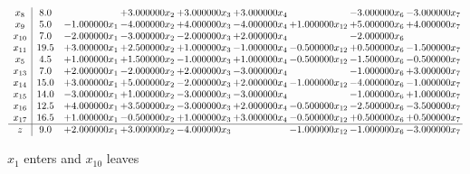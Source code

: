 \documentclass[10pt]{article}
\begin{document}
 \[\begin{array}{c| c c@{\hskip 2pt} c@{\hskip 2pt} c@{\hskip 2pt} c@{\hskip 2pt} c@{\hskip 2pt} c@{\hskip 2pt} c@{\hskip 2pt} }
 x_{8}   &  8.0  &   & + 3.000000 x_{2} & + 3.000000 x_{3} & + 3.000000 x_{4} &   & -3.000000 x_{6} & -3.000000 x_{7}\\
 x_{9}   &  5.0 & -1.000000 x_{1} & -4.000000 x_{2} & + 4.000000 x_{3} & -4.000000 x_{4} & + 1.000000 x_{12} & + 5.000000 x_{6} & + 4.000000 x_{7}\\
 x_{10}   &  7.0 & -2.000000 x_{1} & -3.000000 x_{2} & -2.000000 x_{3} & + 2.000000 x_{4} &   & -2.000000 x_{6} &   \\
 x_{11}   &  19.5 & + 3.000000 x_{1} & + 2.500000 x_{2} & + 1.000000 x_{3} & -1.000000 x_{4} & -0.500000 x_{12} & + 0.500000 x_{6} & -1.500000 x_{7}\\
 x_{5}   &  4.5 & + 1.000000 x_{1} & + 1.500000 x_{2} & -1.000000 x_{3} & + 1.000000 x_{4} & -0.500000 x_{12} & -1.500000 x_{6} & -0.500000 x_{7}\\
 x_{13}   &  7.0 & + 2.000000 x_{1} & -2.000000 x_{2} & + 2.000000 x_{3} & -3.000000 x_{4} &   & -1.000000 x_{6} & + 3.000000 x_{7}\\
 x_{14}   &  15.0 & + 3.000000 x_{1} & + 5.000000 x_{2} & -2.000000 x_{3} & + 2.000000 x_{4} & -1.000000 x_{12} & -4.000000 x_{6} & -1.000000 x_{7}\\
 x_{15}   &  14.0 & -3.000000 x_{1} & + 1.000000 x_{2} & -3.000000 x_{3} & -3.000000 x_{4} &   & -1.000000 x_{6} & + 1.000000 x_{7}\\
 x_{16}   &  12.5 & + 4.000000 x_{1} & + 3.500000 x_{2} & -3.000000 x_{3} & + 2.000000 x_{4} & -0.500000 x_{12} & -2.500000 x_{6} & -3.500000 x_{7}\\
 x_{17}   &  16.5 & + 1.000000 x_{1} & -0.500000 x_{2} & + 1.000000 x_{3} & + 3.000000 x_{4} & -0.500000 x_{12} & + 0.500000 x_{6} & + 0.500000 x_{7}\\
\hline
z    &  9.0 & + 2.000000 x_{1} & + 3.000000 x_{2} & -4.000000 x_{3} &   & -1.000000 x_{12} & -1.000000 x_{6} & -3.000000 x_{7}\\
\end{array}\]


 $ x_{1} $ enters and $ x_{10} $ leaves 
\end{document}
